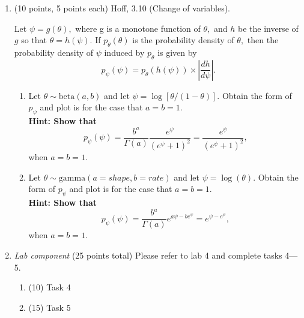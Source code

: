 \documentclass{article}
\begin{document}
\begin{enumerate}
\item (10 points, 5 points each) Hoff, 3.10 (Change of variables). 

Let $\psi= g(\theta),$ where g is a monotone function of $\theta,$ and $h$ be the inverse of $g$ so that $\theta = h(\psi).$ If $p_{\theta}(\theta)$ is the probability density of $\theta,$ then the probability density of $\psi$ induced by $p_{\theta}$ is given by 
$$p_{\psi}(\psi) = p_{\theta}(h(\psi)) \times | \frac{dh}{d\psi} |.$$
\begin{enumerate}
\item Let $\theta \sim \text{beta}(a,b)$ and let $\psi = \log[\theta/(1- \theta)].$ Obtain the form of $p_{\psi}$ and plot is for the case that $a=b=1.$  \\
\textbf{Hint: Show that $$p_{\psi}(\psi) = \frac{b^{a}}{\Gamma(a)}
\frac{e^{\psi}}{(e^{\psi} + 1)^2} = \frac{e^{\psi}}{(e^{\psi} + 1)^2},$$} when $a=b=1.$
\item Let $\theta \sim \text{gamma}(a = shape,b = rate)$ and let $\psi = \log(\theta).$ Obtain the form of $p_{\psi}$ and plot is for the case that $a=b=1.$ \\
\textbf{Hint: Show that $$p_{\psi}(\psi) = \frac{b^{a}}{\Gamma(a)} e^{a\psi - be^{\psi}} = e^{\psi - e^{\psi}},$$} when $a=b=1.$
\end{enumerate}



\item {\em Lab component} 
  (25 points total) Please refer to lab 4 and complete tasks 4---5. 
  \begin{enumerate}
  \item (10) Task 4
  \item (15) Task 5
  \end{enumerate}
  
\end{enumerate}
\end{document}
